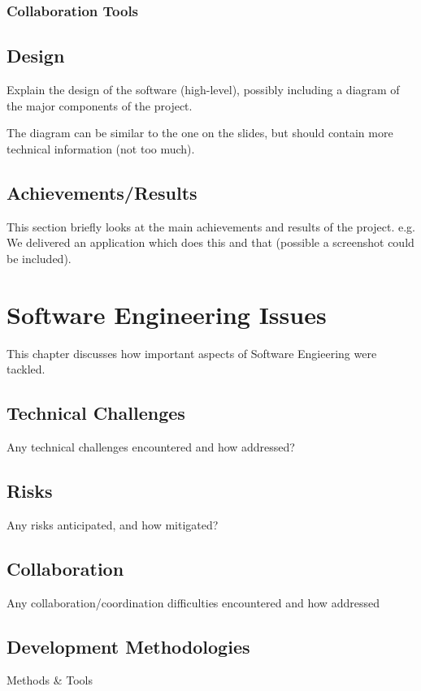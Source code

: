 \documentclass[10pt]{report}
\begin{document}
\subsection {Collaboration Tools}


\section{Design}
Explain the design of the software (high-level), possibly including a diagram of the major components of the project.

The diagram can be similar to the one on the slides, but should contain more technical information (not too much).

\section{Achievements/Results}
This section briefly looks at the main achievements and results of the project.
e.g. We delivered an application which does this and that (possible a screenshot could be included).

\chapter{Software Engineering Issues}

This chapter discusses how important aspects of Software Engieering were tackled.

\section{Technical Challenges}
Any technical challenges encountered and how addressed?

\section{Risks}
Any risks anticipated, and how mitigated?

\section{Collaboration}
Any collaboration/coordination difficulties encountered and how addressed 

\section{Development Methodologies}
Methods \& Tools
\end{document}
